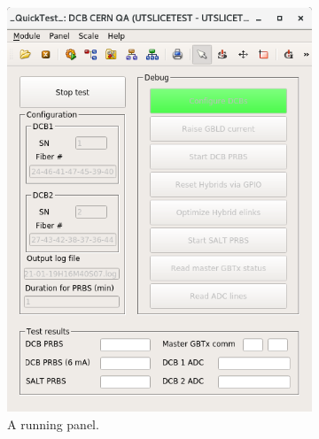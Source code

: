\begin{figure}[!htb]
    \centering
    \begin{subfigure}[t]{0.4\textwidth}
        \centering
        \includegraphics[width=\textwidth]{./figs-ut-upgrade/dcb/dcb_cern_panel_1.png}
        \caption{
            A running panel.
        }
    \end{subfigure}
    \hspace{24pt}
    \begin{subfigure}[t]{0.4\textwidth}
        \centering

\end{subfigure}
\end{figure}
